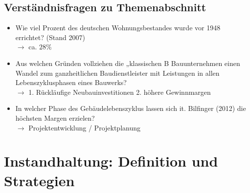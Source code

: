\documentclass[fleqn,twoside,dvipsnames]{article}
\begin{document}
    \subsection{Verständnisfragen zu Themenabschnitt}
        \begin{itemize}
            \item Wie viel Prozent des deutschen Wohnungsbestandes wurde vor 1948 errichtet? (Stand 2007)\\
                    $\rightarrow$ ca. $28 \%$
            \item Aus welchen Gründen vollziehen die „klassischen B Bauunternehmen einen Wandel zum ganzheitlichen Baudienstleister mit Leistungen in allen Lebenszyklusphasen eines Bauwerks?\\
                    $\rightarrow$ 1. Rückläufige Neubauinvestitionen 2. höhere Gewinnmargen
            \item In welcher Phase des Gebäudelebenszyklus lassen sich it. Bilfinger (2012) die höchsten Margen erzielen?\\
                    $\rightarrow$ Projektentwicklung / Projektplanung
        \end{itemize}
      
\newpage
        
\section{Instandhaltung: Definition und Strategien}
\end{document}
